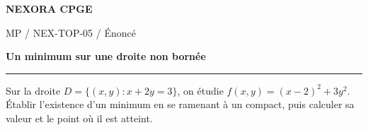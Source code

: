 \documentclass[11pt,a4paper]{article}
\begin{document}
{\small\bfseries\color{nexorablue} NEXORA CPGE}\par
{\small MP / NEX-TOP-05 / Énoncé}\par
{\LARGE\bfseries Un minimum sur une droite non bornée}\par
\vspace{0.25em}\hrule\vspace{0.6em}

Sur la droite $D=\{(x,y):x+2y=3\}$, on étudie $f(x,y)=(x-2)^2+3y^2$. Établir l’existence d’un minimum en se ramenant à un compact, puis calculer sa valeur et le point où il est atteint.
\end{document}
